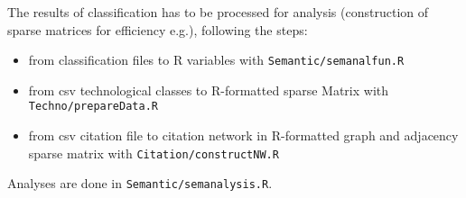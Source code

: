 The results of classification has to be processed for analysis (construction of sparse matrices for efficiency e.g.), following the steps:
\begin{itemize}
\item from classification files to R variables with \texttt{Semantic/semanalfun.R}
\item from csv technological classes to R-formatted sparse Matrix with \texttt{Techno/prepareData.R} 
\item from csv citation file to citation network in R-formatted graph and adjacency sparse matrix with \texttt{Citation/constructNW.R}
\end{itemize}

Analyses are done in \texttt{Semantic/semanalysis.R}.






